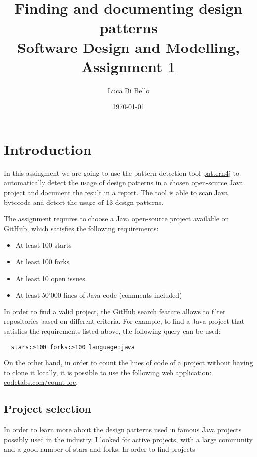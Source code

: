 \documentclass[a4paper, 11pt]{article}
\title{Finding and documenting design patterns \\[1ex] \large Software Design and Modelling, Assignment 1}
\author{Luca Di Bello}
\date{\today}
\begin{document}
\maketitle

\section{Introduction}

In this assingment we are going to use the pattern detection tool \href{https://users.encs.concordia.ca/~nikolaos/pattern\_detection.html}{pattern4j} to automatically detect the usage of design patterns in a chosen open-source Java project and document the result in a report. The tool is able to scan Java bytecode and detect the usage of 13 design patterns.

The assignment requires to choose a Java open-source project available on GitHub, which satisfies the following requirements:

\begin{itemize}
	\item At least 100 starts
	\item At least 100 forks
	\item At least 10 open issues
	\item At least 50'000 lines of Java code (comments included)
\end{itemize}

\noindent In order to find a valid project, the GitHub search feature allows to filter repositories based on different criteria. For example, to find a Java project that satisfies the requirements listed above, the following query can be used:

\begin{verbatim}
  stars:>100 forks:>100 language:java
\end{verbatim}

\noindent On the other hand, in order to count the lines of code of a project without having to clone it locally, it is possible to use the following web application: \href{https://codetabs.com/count-loc/count-loc-online.html}{codetabs.com/count-loc}.

\subsection{Project selection}

In order to learn more about the design patterns used in famous Java projects possibly used in the industry, I looked for active projects, with a large community and a good number of stars and forks. In order to find projects
\end{document}
